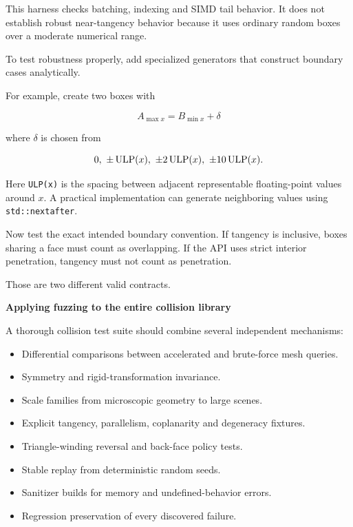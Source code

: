 This harness checks batching, indexing and SIMD tail behavior. It does not establish robust near-tangency behavior because it uses ordinary random boxes over a moderate numerical range.

To test robustness properly, add specialized generators that construct boundary cases analytically.

For example, create two boxes with

\[
A_{\max x}=B_{\min x}+\delta
\]

where \(\delta\) is chosen from

\[
\\{0,\ \pm\operatorname{ULP}(x),\ \pm2\operatorname{ULP}(x),\ \pm10\operatorname{ULP}(x)\\}.
\]

Here \texttt{ULP(x)} is the spacing between adjacent representable floating-point values around \(x\). A practical implementation can generate neighboring values using \texttt{std::nextafter}.

Now test the exact intended boundary convention. If tangency is inclusive, boxes sharing a face must count as overlapping. If the API uses strict interior penetration, tangency must not count as penetration.

Those are two different valid contracts.

\textbf{Applying fuzzing to the entire collision library}

A thorough collision test suite should combine several independent mechanisms:

\begin{itemize}
\tightlist
\item
  Differential comparisons between accelerated and brute-force mesh queries.
\item
  Symmetry and rigid-transformation invariance.
\item
  Scale families from microscopic geometry to large scenes.
\item
  Explicit tangency, parallelism, coplanarity and degeneracy fixtures.
\item
  Triangle-winding reversal and back-face policy tests.
\item
  Stable replay from deterministic random seeds.
\item
  Sanitizer builds for memory and undefined-behavior errors.
\item
  Regression preservation of every discovered failure.
\end{itemize}

